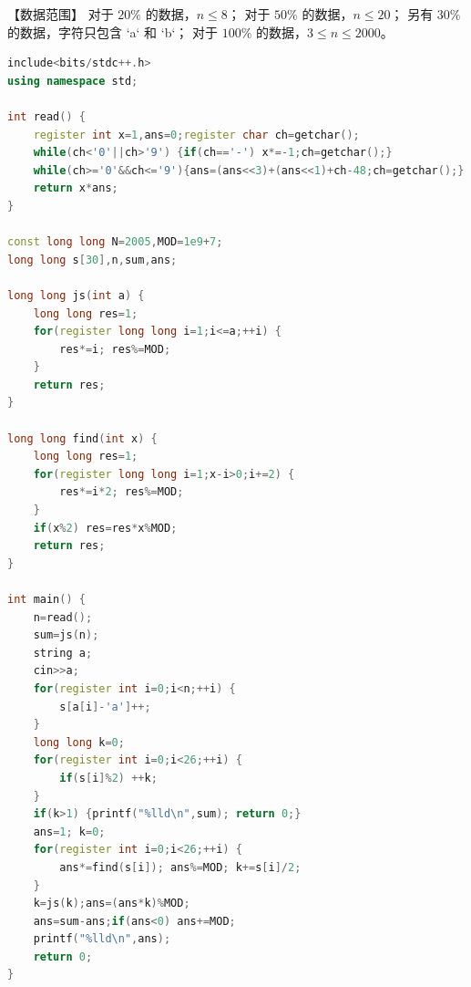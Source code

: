 \documentclass[12pt,twiside,a4paper]{ctexbook}
\numberwithin{chapter}{part}
\begin{document}
【数据范围】  
对于 $20\%$ 的数据，$n \le 8$；  
对于 $50\%$ 的数据，$n \le 20$；  
另有 $30\%$ 的数据，字符只包含 `a` 和 `b`；  
对于 $100\%$ 的数据，$3 \le n \le 2000$。
\begin{lstlisting}[language=c++,breaklines=true]
include<bits/stdc++.h>
using namespace std;

int read() {
	register int x=1,ans=0;register char ch=getchar();
	while(ch<'0'||ch>'9') {if(ch=='-') x*=-1;ch=getchar();}
	while(ch>='0'&&ch<='9'){ans=(ans<<3)+(ans<<1)+ch-48;ch=getchar();}
	return x*ans;
}

const long long N=2005,MOD=1e9+7;
long long s[30],n,sum,ans;

long long js(int a) {
	long long res=1;
	for(register long long i=1;i<=a;++i) {
		res*=i; res%=MOD;
	}
	return res;
}

long long find(int x) {
	long long res=1;
	for(register long long i=1;x-i>0;i+=2) {
		res*=i*2; res%=MOD;
	}
	if(x%2) res=res*x%MOD;
	return res;
}

int main() {
	n=read();
	sum=js(n);
	string a;
	cin>>a;
	for(register int i=0;i<n;++i) {
		s[a[i]-'a']++;
	}
	long long k=0;
	for(register int i=0;i<26;++i) {
		if(s[i]%2) ++k; 
	}
	if(k>1) {printf("%lld\n",sum); return 0;}
	ans=1; k=0;
	for(register int i=0;i<26;++i) {
		ans*=find(s[i]); ans%=MOD; k+=s[i]/2;
	}
	k=js(k);ans=(ans*k)%MOD;
	ans=sum-ans;if(ans<0) ans+=MOD;
	printf("%lld\n",ans);
	return 0;
}
\end{lstlisting}

\begin{lstlisting}[language=c++,breaklines=true]

\end{lstlisting}


\begin{lstlisting}[language=c++,breaklines=true]

\end{lstlisting}

\section{}
\begin{lstlisting}[language=c++,breaklines=true]

\end{lstlisting}

\clearpage
\end{document}
